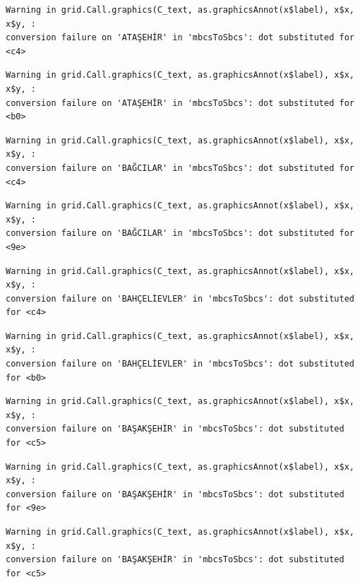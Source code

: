 \documentclass[
  11pt,
  a4paper,
  DIV=11,
  numbers=noendperiod]{scrartcl}
\begin{document}
\begin{verbatim}
Warning in grid.Call.graphics(C_text, as.graphicsAnnot(x$label), x$x, x$y, :
conversion failure on 'ATAŞEHİR' in 'mbcsToSbcs': dot substituted for <c4>
\end{verbatim}

\begin{verbatim}
Warning in grid.Call.graphics(C_text, as.graphicsAnnot(x$label), x$x, x$y, :
conversion failure on 'ATAŞEHİR' in 'mbcsToSbcs': dot substituted for <b0>
\end{verbatim}

\begin{verbatim}
Warning in grid.Call.graphics(C_text, as.graphicsAnnot(x$label), x$x, x$y, :
conversion failure on 'BAĞCILAR' in 'mbcsToSbcs': dot substituted for <c4>
\end{verbatim}

\begin{verbatim}
Warning in grid.Call.graphics(C_text, as.graphicsAnnot(x$label), x$x, x$y, :
conversion failure on 'BAĞCILAR' in 'mbcsToSbcs': dot substituted for <9e>
\end{verbatim}

\begin{verbatim}
Warning in grid.Call.graphics(C_text, as.graphicsAnnot(x$label), x$x, x$y, :
conversion failure on 'BAHÇELİEVLER' in 'mbcsToSbcs': dot substituted for <c4>
\end{verbatim}

\begin{verbatim}
Warning in grid.Call.graphics(C_text, as.graphicsAnnot(x$label), x$x, x$y, :
conversion failure on 'BAHÇELİEVLER' in 'mbcsToSbcs': dot substituted for <b0>
\end{verbatim}

\begin{verbatim}
Warning in grid.Call.graphics(C_text, as.graphicsAnnot(x$label), x$x, x$y, :
conversion failure on 'BAŞAKŞEHİR' in 'mbcsToSbcs': dot substituted for <c5>
\end{verbatim}

\begin{verbatim}
Warning in grid.Call.graphics(C_text, as.graphicsAnnot(x$label), x$x, x$y, :
conversion failure on 'BAŞAKŞEHİR' in 'mbcsToSbcs': dot substituted for <9e>
\end{verbatim}

\begin{verbatim}
Warning in grid.Call.graphics(C_text, as.graphicsAnnot(x$label), x$x, x$y, :
conversion failure on 'BAŞAKŞEHİR' in 'mbcsToSbcs': dot substituted for <c5>
\end{verbatim}
\end{document}
